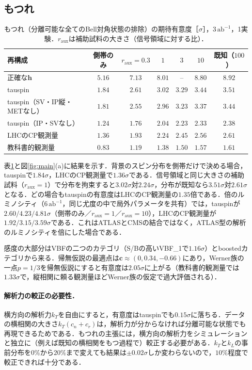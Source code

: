 \documentclass[paper=a4,fontsize=10pt,jafontsize=10pt,line_length=44zw,number_of_lines=46]{jlreq}
\newcommand{\abinv}{\,\mathrm{ab}^{-1}}
\newcommand{\hvec}{\boldsymbol{h}}
\begin{document}
\subsection{もつれ}

\begin{table}[t]
  \centering
  \caption{もつれ（分離可能な全てのBell対角状態の排除）の期待有意度［$\sigma$］，$3\abinv$，1実験．$r_{\mathrm{aux}}$は補助試料の大きさ（信号領域に対する比）．}
  \label{tab:ent}
  \begin{tabular}{lcccccc}
    \toprule
    再構成 & 側帯のみ & $r_{\mathrm{aux}}=0.3$ & $1$ & $3$ & $10$ & 既知（$100$） \\
    \midrule
    正確な$\hvec$ & $5.16$ & $7.13$ & $8.01$ & -- & $8.80$ & $8.92$ \\
    tauspin & $1.84$ & $2.61$ & $3.02$ & $3.29$ & $3.44$ & $3.51$ \\
    tauspin（SV・IP縦・METなし） & $1.81$ & $2.55$ & $2.96$ & $3.23$ & $3.37$ & $3.44$ \\
    tauspin（IP・SVなし） & $1.24$ & $1.76$ & $2.04$ & $2.23$ & $2.33$ & $2.38$ \\
    LHCのCP観測量 & $1.36$ & $1.93$ & $2.24$ & $2.45$ & $2.56$ & $2.61$ \\
    教科書的観測量 & $0.83$ & $1.19$ & $1.38$ & $1.50$ & $1.57$ & $1.61$ \\
    \bottomrule
  \end{tabular}
\end{table}

表\ref{tab:ent}と図\ref{fig:main}(a)に結果を示す．背景のスピン分布を側帯だけで決める場合，tauspinで$1.84\sigma$，LHCのCP観測量で$1.36\sigma$である．信号領域と同じ大きさの補助試料（$r_{\mathrm{aux}}=1$）で分布を拘束すると$3.02\sigma$対$2.24\sigma$，分布が既知なら$3.51\sigma$対$2.61\sigma$となる．どの場合もtauspinの有意度はLHCのCP観測量の$1.35$倍である．倍のルミノシティ（$6\abinv$，同じ尤度の中で局外パラメータを共有）では，tauspinが$2.60/4.23/4.81\sigma$（側帯のみ／$r_{\mathrm{aux}}=1$／$r_{\mathrm{aux}}=10$），LHCのCP観測量が$1.92/3.15/3.59\sigma$である．これはATLASとCMSの結合ではなく，ATLAS型の解析のルミノシティを倍にした場合である．

感度の大部分はVBFの二つのカテゴリ（S/Bの高いVBF\_1で$1.16\sigma$）とboostedカテゴリから来る．帰無仮説の最適点は$\boldsymbol c\approx(0,0.34,-0.66)$にあり，Werner族の一点$p=1/3$を帰無仮説にすると有意度は$2.05\sigma$に上がる（教科書的観測量では$1.33\sigma$で，縦相関に頼る観測量ほどWerner族の仮定で過大評価される）．

\paragraph{解析力の較正の必要性．}横方向の解析力$k_T$を自由にすると，有意度はtauspinでも$0.15\sigma$に落ちる．データの横相関の大きさ$k_T(c_n+c_r)$は，解析力が分からなければ分離可能な状態でも再現できるためである．もつれの主張には，横方向の解析力をシミュレーションと独立に（例えば既知の横相関をもつ過程で）較正する必要がある．$k_T$と$k_L$の事前分布を$0\%$から$20\%$まで変えても結果は$\pm0.02\sigma$しか変わらないので，$10\%$程度で較正できれば十分である．
\end{document}
